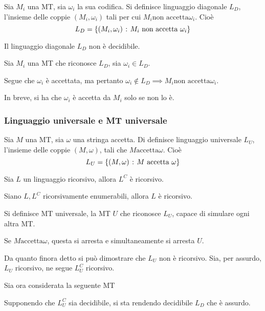 \documentclass{subfiles}
\begin{document}
\begin{Definition*}
    Sia \(M_{i}\) una MT, sia \(\omega_{i}\) la sua codifica.
    Si definisce linguaggio diagonale \(L_{D}\), l'insieme delle coppie \((M_{i}, \omega_{i})\) tali per cui \(M_{i} \text{non accetta} \omega_{i}\). Cioè
    \[
        L_{D} = \set{(M_{i}, \omega_{i})}{M_{i} \text{non accetta} \omega_{i}}
    \]
\end{Definition*}
\begin{Theorem}
    Il linguaggio diagonale \(L_{D}\) non è decidibile.
    \begin{Proof*}
        Sia \(M_{i}\) una MT che riconosce \(L_{D}\), sia \(\omega_{i} \in L_{D}\).

        \noindent Segue che \(\omega_{i}\) è accettata, ma pertanto \(\omega_{i} \notin L_{D} \implies M_{i} \text{non accetta} \omega_{i}\).

        \noindent In breve, si ha che \(\omega_{i}\) è accetta da \(M_{i}\) solo se non lo è.
    \end{Proof*}
\end{Theorem}

\subsubsection{Linguaggio universale e MT universale}
\begin{Definition*}
    Sia \(M\) una MT, sia \(\omega\) una stringa accetta. Di definisce linguaggio universale \(L_{U}\), l'insieme delle coppie \((M, \omega)\), tali che \(M \text{accetta} \omega\). Cioè
    \[
        L_{U} = \set{(M, \omega)}{M \text{accetta} \omega}
    \]
\end{Definition*}
\begin{Theorem}
    Sia \(L\) un linguaggio ricorsivo, allora \(L^{C}\) è ricorsivo.
\end{Theorem}
\begin{Theorem}
    Siano \(L, L^{C}\) ricorsivamente enumerabili, allora \(L\) è ricorsivo.
\end{Theorem}
\begin{Definition*}
    Si definisce MT universale, la MT \(U\) che riconosce \(L_{U}\), capace di simulare ogni altra MT.
\end{Definition*}
\begin{Note*}\label{Note: }
    Se \(M \text{accetta} \omega\), questa si arresta e simultaneamente si arresta \(U\).
\end{Note*}

\noindent Da quanto finora detto si può dimostrare che \(L_{U}\) non è ricorsivo.
\noindent Sia, per assurdo, \(L_{U}\) ricorsivo, ne segue \(L_{U}^{C}\) ricorsivo.

\noindent Sia ora considerata la seguente MT


\noindent Supponendo che \(L_{U}^{C}\) sia decidibile, si sta rendendo decidibile \(L_{D}\) che è assurdo.
\end{document}
